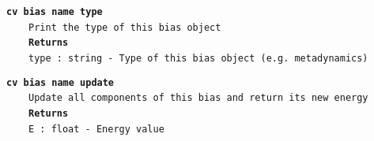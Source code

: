 \begin{mdexampleinput}{}
\texttt{\textbf{cv bias name type}}
\\
\-~~~~\texttt{Print the type of this bias object}
\\
\-~~~~\texttt{\textbf{Returns}}
\\
\-~~~~\texttt{type : string - Type of this bias object (e.g. metadynamics)}
\end{mdexampleinput}
\begin{mdexampleinput}{}
\texttt{\textbf{cv bias name update}}
\\
\-~~~~\texttt{Update all components of this bias and return its new energy}
\\
\-~~~~\texttt{\textbf{Returns}}
\\
\-~~~~\texttt{E : float - Energy value}
\end{mdexampleinput}
